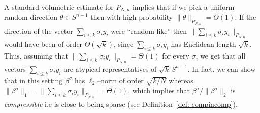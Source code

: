 \documentclass[11pt]{amsart}
\theoremstyle{definition}
\theoremstyle{plain}
\begin{document}
A standard volumetric estimate for $P_{N,n}$ implies that if we pick a uniform
random direction $\theta \in S^{n-1}$ then with high probability
$\|\theta\|_{P_{N,n}} =\Theta(1)$. If the direction of the vector
$\sum_{i\leq k} \sigma_i y_i$ were ``random-like'' then $\|\sum_{i\leq k} \sigma_i y_i\|_{P_{N,n}}$ would have been
of order $\Theta(\sqrt{k})$, since $\sum_{i\leq k} \sigma_i y_i$ has Euclidean length $\sqrt{k}$. Thus, assuming that $\|\sum_{i\leq k} \sigma_i y_i\|_{P_{N,n}}=\Theta(1)$ for every $\sigma$, we
get that all vectors $\sum_{i\leq k} \sigma_i y_i$ are atypical representatives of $\sqrt{k}\,S^{n-1}$.
In fact, we can show that in this setting $\beta^\sigma$ has $\ell_2$--norm of order $\sqrt{k/N}$
whereas $\|\beta^\sigma\|_1 = \|\sum_{i\leq k} \sigma_i y_i\|_{P_{N,n}} = \Theta(1)$,
which implies that $\beta^\sigma/\|\beta^\sigma\|_2$ is {\it compressible} i.e
is close to being sparse (see Definition~\ref{def: compincomp}).
\end{document}
